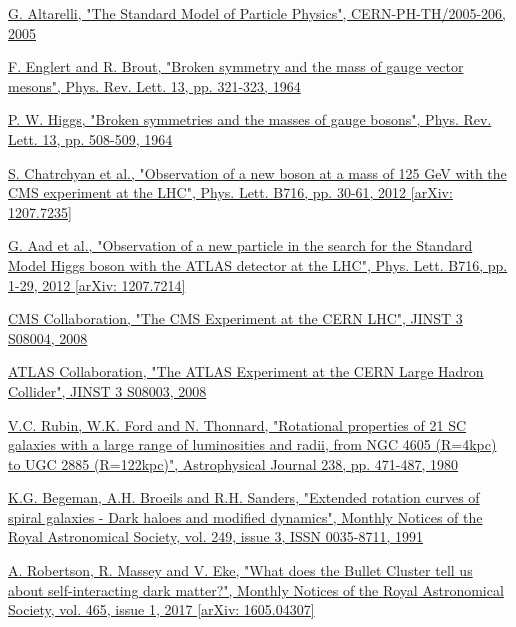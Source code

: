 \documentclass[a4paper, 10pt, openright]{report}
\begin{document}
\begin{thebibliography}{1}

\href{https://arxiv.org/abs/hep-ph/0510281}{G. Altarelli,
"The Standard Model of Particle Physics",
CERN-PH-TH/2005-206, 2005}

\href{https://journals.aps.org/prl/abstract/10.1103/PhysRevLett.13.321}{F. Englert and R. Brout, 
"Broken symmetry and the mass of gauge vector mesons",
Phys. Rev. Lett. 13, pp. 321-323, 1964}

\href{https://journals.aps.org/prl/abstract/10.1103/PhysRevLett.13.508}{P. W. Higgs, 
"Broken symmetries and the masses of gauge bosons",
Phys. Rev. Lett. 13, pp. 508-509, 1964}

\href{https://arxiv.org/abs/1207.7235}{S. Chatrchyan et al.,
"Observation of a new boson at a mass of 125 GeV with the CMS experiment at the LHC",
Phys. Lett. B716, pp. 30-61, 2012 [arXiv: 1207.7235]
}

\href{https://arxiv.org/abs/1207.7214}{G. Aad et al.,
"Observation of a new particle in the search for the Standard Model Higgs boson with the ATLAS detector at the LHC", 
Phys. Lett. B716, pp. 1-29, 2012 [arXiv: 1207.7214]}

\href{http://inspirehep.net/record/796887/}{CMS Collaboration,
"The CMS Experiment at the CERN LHC",
JINST 3 S08004, 2008}

\href{http://inspirehep.net/record/796888/}{ATLAS Collaboration,
"The ATLAS Experiment at the CERN Large Hadron Collider",
JINST 3 S08003, 2008}

\href{https://ui.adsabs.harvard.edu/abs/1980ApJ...238..471R/abstract}{V.C. Rubin, W.K. Ford and N. Thonnard,
"Rotational properties of 21 SC galaxies with a large range of luminosities and radii, from NGC 4605 (R=4kpc) to UGC 2885 (R=122kpc)",
Astrophysical Journal 238, pp. 471-487, 1980}

\href{https://academic.oup.com/mnras/article/249/3/523/1005565}{K.G. Begeman, A.H. Broeils and R.H. Sanders,
"Extended rotation curves of spiral galaxies - Dark haloes and modified dynamics",
Monthly Notices of the Royal Astronomical Society, vol. 249, issue 3, ISSN 0035-8711, 1991}

\href{https://arxiv.org/abs/1605.04307}{A. Robertson, R. Massey and V. Eke,
"What does the Bullet Cluster tell us about self-interacting dark matter?",
Monthly Notices of the Royal Astronomical Society, vol. 465, issue 1, 2017 [arXiv: 1605.04307]}


\end{thebibliography}
\end{document}

